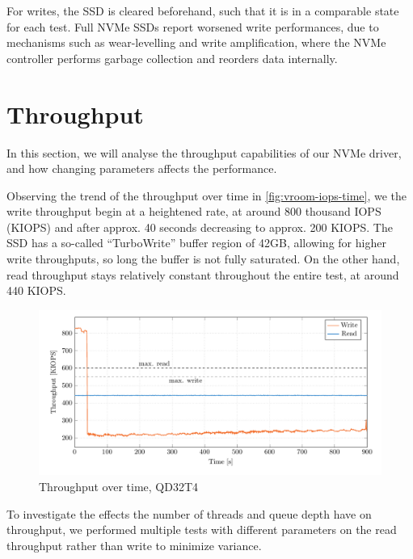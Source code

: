 For writes, the SSD is cleared beforehand, such that it is in a comparable state for each test. Full NVMe SSDs report worsened write performances, due to mechanisms such as wear-levelling and write amplification, where the NVMe controller performs garbage collection and reorders data internally.

\section{Throughput}
In this section, we will analyse the throughput capabilities of our NVMe driver, and how changing parameters affects the performance.

Observing the trend of the throughput over time in \autoref{fig:vroom-iops-time}, we the write throughput begin at a heightened rate, at around 800 thousand IOPS (KIOPS) and after approx. 40 seconds decreasing to approx. 200 KIOPS. The SSD has a so-called ``TurboWrite'' buffer region of 42GB, allowing for higher write throughputs, so long the buffer is not fully saturated. On the other hand, read throughput stays relatively constant throughout the entire test, at around 440 KIOPS.

\begin{figure}
  \centering
    \includegraphics[width=\textwidth]{figures/vroom-iops-time}
    \caption{Throughput over time, QD32T4}
    \label{fig:vroom-iops-time}
\end{figure}

To investigate the effects the number of threads and queue depth have on throughput, we performed multiple tests with different parameters on the read throughput rather than write to minimize variance.

